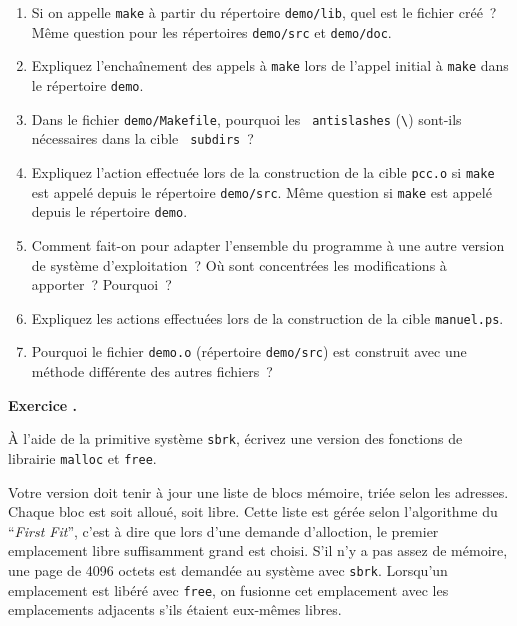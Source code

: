 \documentclass [twoside] {report}
\newcounter {td}
\newcounter {question} [td]
\renewcommand {\thequestion} {\arabic{td}.\arabic {question}}
\newcommand {\question}
    {
        \refstepcounter {question}
        \bigskip
        {\Large\bf Exercice \thequestion} %
        \nopagebreak
        \bigskip

        \nopagebreak
    }
\begin{document}
\begin {enumerate}
    \item Si on appelle {\tt make} à partir du répertoire {\tt demo/lib},
	quel est le fichier créé~? Même question pour les répertoires
	{\tt demo/src} et {\tt demo/doc}.

    \item Expliquez l'enchaînement des appels à {\tt make} lors de
	l'appel initial à {\tt make} dans le répertoire {\tt demo}.

    \item Dans le fichier {\tt demo/Makefile}, pourquoi les {\tt
	antislashes} (\verb:\:) sont-ils nécessaires dans la cible {\tt
	subdirs}~?

    \item Expliquez l'action effectuée lors de la construction de la
	cible {\tt pcc.o} si {\tt make} est appelé depuis le répertoire
	{\tt demo/src}. Même question si {\tt make} est appelé depuis le
	répertoire {\tt demo}.

    \item Comment fait-on pour adapter l'ensemble du programme à une
	autre version de système d'exploitation~? Où sont concentrées
	les modifications à apporter~? Pourquoi~?

    \item Expliquez les actions effectuées lors de la construction de la
	cible {\tt manuel.ps}.

    \item Pourquoi le fichier {\tt demo.o} (répertoire {\tt demo/src}) est
	construit avec une méthode différente des autres fichiers~?

\end {enumerate}



\question

\`A l'aide de la primitive système {\tt sbrk}, écrivez une version
des fonctions de librairie {\tt malloc} et {\tt free}.

Votre version doit tenir à jour une liste de blocs mémoire, triée
selon les adresses. Chaque bloc
est soit alloué, soit libre. Cette liste est gérée selon l'algorithme
du ``{\em First Fit\/}'', c'est à dire que lors d'une demande
d'alloction, le premier emplacement libre suffisamment grand est
choisi. S'il n'y a pas assez de mémoire, une page de 4096 octets
est demandée au système avec {\tt sbrk}. Lorsqu'un emplacement est
libéré avec {\tt free}, on fusionne cet emplacement avec les
emplacements adjacents s'ils étaient eux-mêmes libres.
\end{document}
